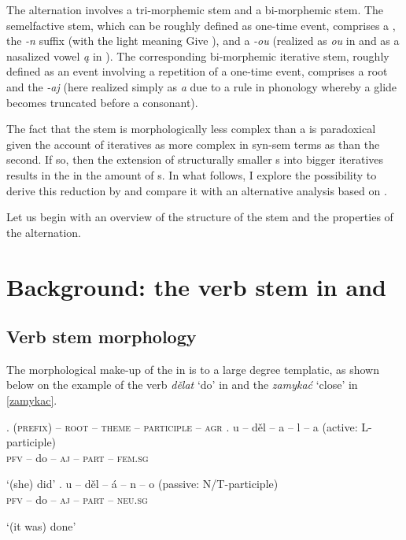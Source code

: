 The alternation involves a tri-mor\-phe\-mic   stem and a bi-morphemic  stem. The semelfactive stem, which can be roughly defined as one-time event, comprises a , the \textit{-n} suffix (with the light  meaning Give ), and a  \textit{-ou} (realized as \textit{ou} in  and as a nasalized vowel \textit{\k{a}} in ). The corresponding bi-morphemic iterative stem, roughly defined as an event involving a repetition of a one-time event, comprises a root and the  \textit{-aj} (here realized simply as \textit{a} due to a rule in  phonology whereby a glide becomes truncated  before a consonant).
\par
The fact that the  stem is morphologically less complex than a  is paradoxical given the account of iteratives as more complex in syn-sem terms as than the second. If so, then the extension of structurally smaller s into bigger iteratives results in the  in the amount of s. In what follows, I explore the possibility to derive this  reduction by  and compare it with an alternative analysis based on . 
\par
Let us begin with an overview of the structure of the   stem and the properties of the  alternation. 

\section{Background: the verb stem in  and }

\subsection{Verb stem morphology}

The morphological make-up of the  in  is to a large degree templatic, as shown below on the example of the  verb \textit{d\v elat} `do' in \Next and the   \textit{zamyka\'c} `close' in \ref{zamykac}.

\ex.\label{verb}	
\textsc{(prefix) -- root -- theme -- participle -- agr} 
\ag.
u -- d\v el -- a -- l -- a (active: L-participle)\label{1a} \\
\textsc{pfv} -- do -- \textsc{aj} -- \textsc{part} -- \textsc{fem.sg} \\
\strut `(she) did' 
\bg. u -- d\v el -- \'a -- n -- o (passive: N/T-participle)\label{1b}\\
\textsc{pfv} -- do -- \textsc{aj} -- \textsc{part} -- \textsc{neu.sg} \\
\strut `(it was) done' 

